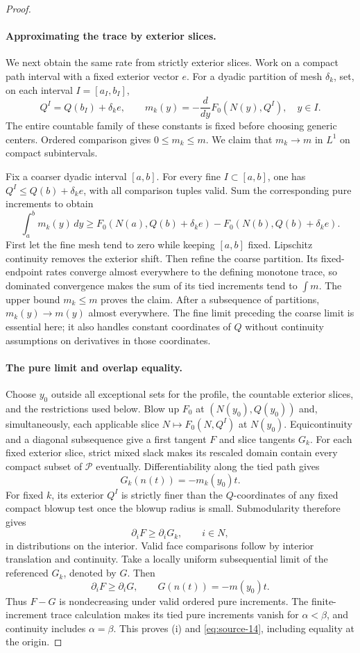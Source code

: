 \begin{proof}
\paragraph{Approximating the trace by exterior slices.}
We next obtain the same rate from strictly exterior slices.
Work on a compact path interval with a fixed exterior vector
$e$.  For a dyadic partition of mesh $\delta_k$, set, on each
interval $I=[a_I,b_I]$,
\[
Q^I=Q(b_I)+\delta_k e,
\qquad
m_k(y)=-\frac{d}{dy}F_0(N(y),Q^I),\quad y\in I.
\]
The entire countable family of these constants is fixed before
choosing generic centers.  Ordered comparison gives
$0\leq m_k\leq m$.  We claim that $m_k\to m$ in $L^1$ on
compact subintervals.

Fix a coarser dyadic interval $[a,b]$.  For every fine
$I\subset[a,b]$, one has $Q^I\leq Q(b)+\delta_k e$, with all
comparison tuples valid.  Sum the corresponding pure increments
to obtain
\[
\int_a^b m_k(y)\,dy
\geq F_0(N(a),Q(b)+\delta_k e)
      -F_0(N(b),Q(b)+\delta_k e).
\]
First let the fine mesh tend to zero while keeping $[a,b]$
fixed.  Lipschitz continuity removes the exterior shift.
Then refine the coarse partition.  Its fixed-endpoint rates
converge almost everywhere to the defining monotone trace,
so dominated convergence makes the sum of its tied increments
tend to $\int m$.  The upper bound $m_k\leq m$ proves the
claim.  After a subsequence of partitions, $m_k(y)\to m(y)$
almost everywhere.  The fine limit preceding the coarse limit
is essential here; it also handles constant coordinates of $Q$
without continuity assumptions on derivatives in those
coordinates.

\paragraph{The pure limit and overlap equality.}
Choose $y_0$ outside all exceptional sets for the profile, the
countable exterior slices, and the restrictions used below.
Blow up $F_0$ at $(N(y_0),Q(y_0))$ and, simultaneously, each
applicable slice $N\mapsto F_0(N,Q^I)$ at $N(y_0)$.
Equicontinuity and a diagonal subsequence give a first tangent
$F$ and slice tangents $G_k$.  For each fixed exterior slice,
strict mixed slack makes its rescaled domain contain every
compact subset of $\mathcal P$ eventually.  Differentiability
along the tied path gives
\[
G_k(n(t))=-m_k(y_0)t.
\]
For fixed $k$, its exterior $Q^I$ is strictly finer than the
$Q$-coordinates of any fixed compact blowup test once the
blowup radius is small.  Submodularity therefore gives
\[
\partial_iF\geq\partial_iG_k,\qquad i\in N,
\]
in distributions on the interior.  Valid face comparisons
follow by interior translation and continuity.  Take a locally
uniform subsequential limit of the referenced $G_k$, denoted by
$G$.  Then
\[
\partial_iF\geq\partial_iG,
\qquad G(n(t))=-m(y_0)t.
\]
Thus $F-G$ is nondecreasing under valid ordered pure increments.
The finite-increment trace calculation makes its tied pure
increments vanish for $\alpha<\beta$, and continuity includes
$\alpha=\beta$.  This proves (i) and
\eqref{eq:source-14}, including equality at the origin.


\end{proof}
